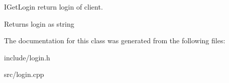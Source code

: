 I\+Get\+Login return login of client. 

\begin{DoxyReturn}{Returns}
login as string 
\end{DoxyReturn}


The documentation for this class was generated from the following files\+:\begin{DoxyCompactItemize}
\item 
include/login.\+h\item 
src/login.\+cpp\end{DoxyCompactItemize}
